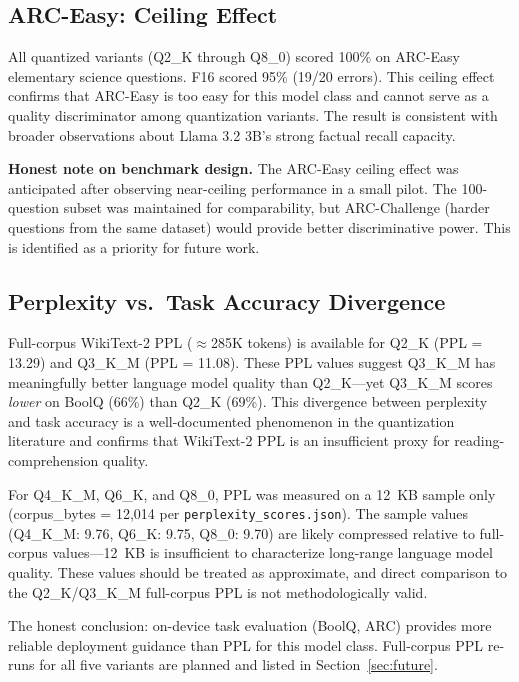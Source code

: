 \documentclass[conference]{IEEEtran}
\begin{document}
\subsection{ARC-Easy: Ceiling Effect}

All quantized variants (Q2\_K through Q8\_0) scored 100\% on ARC-Easy
elementary science questions. F16 scored 95\% (19/20 errors). This ceiling
effect confirms that ARC-Easy is too easy for this model class and cannot
serve as a quality discriminator among quantization variants. The result
is consistent with broader observations about Llama 3.2 3B's strong factual
recall capacity.

\textbf{Honest note on benchmark design.} The ARC-Easy ceiling effect was
anticipated after observing near-ceiling performance in a small pilot.
The 100-question subset was maintained for comparability, but ARC-Challenge
(harder questions from the same dataset) would provide better discriminative
power. This is identified as a priority for future work.

\subsection{Perplexity vs.\ Task Accuracy Divergence}

Full-corpus WikiText-2 PPL (${\approx}$285K tokens) is available for Q2\_K
(PPL = 13.29) and Q3\_K\_M (PPL = 11.08). These PPL values suggest Q3\_K\_M
has meaningfully better language model quality than Q2\_K---yet Q3\_K\_M scores
\emph{lower} on BoolQ (66\%) than Q2\_K (69\%). This divergence between
perplexity and task accuracy is a well-documented phenomenon in the quantization
literature and confirms that WikiText-2 PPL is an insufficient proxy for
reading-comprehension quality.

For Q4\_K\_M, Q6\_K, and Q8\_0, PPL was measured on a 12~KB sample only
(corpus\_bytes = 12,014 per \texttt{perplexity\_scores.json}). The sample
values (Q4\_K\_M: 9.76, Q6\_K: 9.75, Q8\_0: 9.70) are likely compressed
relative to full-corpus values---12~KB is insufficient to characterize
long-range language model quality. These values should be treated as
approximate, and direct comparison to the Q2\_K/Q3\_K\_M full-corpus PPL
is not methodologically valid.

The honest conclusion: on-device task evaluation (BoolQ, ARC) provides more
reliable deployment guidance than PPL for this model class. Full-corpus PPL
re-runs for all five variants are planned and listed in Section~\ref{sec:future}.
\end{document}
